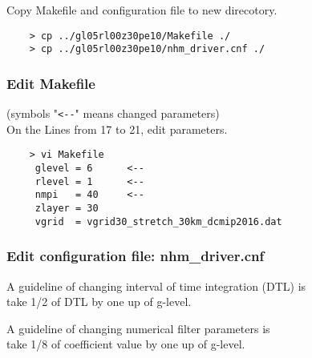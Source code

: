  \noindent Copy Makefile and configuration file to new direcotory.
 \begin{verbatim}
    > cp ../gl05rl00z30pe10/Makefile ./
    > cp ../gl05rl00z30pe10/nhm_driver.cnf ./
 \end{verbatim}

\subsubsection{Edit Makefile}
 (symbols "\verb|<--|" means changed parameters) \\
 On the Lines from 17 to 21, edit parameters.
 \begin{verbatim}
    > vi Makefile
     glevel = 6      <--
     rlevel = 1      <--
     nmpi   = 40     <--
     zlayer = 30
     vgrid  = vgrid30_stretch_30km_dcmip2016.dat
 \end{verbatim}

\subsubsection{Edit configuration file: nhm\_driver.cnf}
 \noindent A guideline of changing interval of time integration (DTL) is \\
 {\sf take 1/2 of DTL by one up of g-level}.

 \noindent A guideline of changing numerical filter parameters is \\
 {\sf take 1/8 of coefficient value by one up of g-level}. \\

